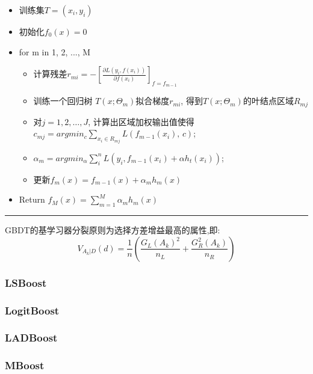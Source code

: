 \documentclass[a4paper]{article}
\begin{document}
				\begin{itemize}
					\item 训练集$T={(x_i,y_i)}$
					\item 初始化$f_0(x) = 0$
					\item for m in 1, 2, ..., M
						\begin{itemize}
							\item 计算残差$r_{mi} = -[\frac{\partial L(y_i, f(x_i))}{\partial f(x_i)}]_{f=f_{m-1}}$
							\item 训练一个回归树 $T(x;\Theta_m)$拟合梯度$r_{mi}$, 得到$T(x;\Theta_m)$的叶结点区域$R_{mj}$
							\item 对$j = 1, 2,\dots, J$, 计算出区域加权输出值使得$c_{mj} = argmin_{c}\sum_{x_i\in R_{mj}}L(f_{m-1}(x_i),\,c)$;
							\item $\alpha_m = argmin_{\alpha}\sum_{i}^{n}L(y_i, f_{m-1}(x_i)+\alpha h_t(x_i))$;
							\item 更新$f_m(x)  = f_{m-1}(x) + \alpha_mh_m(x)$
						\end{itemize}
					\item Return $f_M(x) = \sum_{m=1}^{M}\alpha_mh_m(x)$
				\end{itemize}
			\noindent\rule[0.10\baselineskip]{\textwidth}{0.75pt}\par
			GBDT的基学习器分裂原则为选择方差增益最高的属性,即:
			$$V_{A_k|D}(d) = \frac{1}{n}(\frac{G_L(A_k)^2}{n_L}+\frac{G_R^2(A_k)}{n_R})$$
		\subsubsection{LSBoost}
		\subsubsection{LogitBoost}
		\subsubsection{LADBoost}
		\subsubsection{MBoost}
\end{document}
